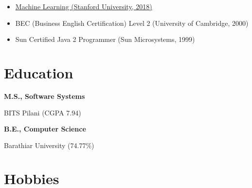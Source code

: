 \documentclass[a4paper,11pt]{article}
\newcommand\cveducation[4]{

  \normalfont\bf{#1, #2}

  \normalfont\small{#3 (#4)}
}
\begin{document}
\begin{multicols}{2}
\begin{itemize}
\item
  \href{https://www.coursera.org/account/accomplishments/verify/2YVCNYET6XSL}{Machine Learning (Stanford University, 2018)}

\item BEC (Business English Certification) Level 2 (University of Cambridge, 2000)
  
\item Sun Certified Java 2 Programmer (Sun Microsystems, 1999)
  
\end{itemize}

\section*{Education}

\cveducation{M.S.}{Software Systems}{BITS Pilani}{CGPA 7.94}
\cveducation{B.E.}{Computer Science}{Barathiar University}{74.77\%}

\end{multicols}

\section*{Hobbies}

\end{document}

